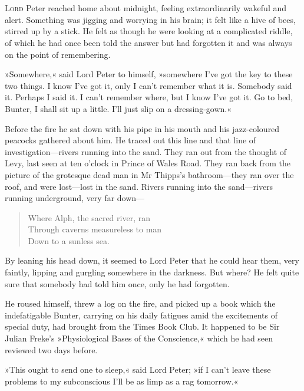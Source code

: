 \chapter[Chapter \thechapter]{}
\lettrine[lines=4]{L}{ord} Peter reached home about midnight, feeling extraordinarily wakeful and alert. Something was jigging and worrying in his brain; it felt like a hive of bees, stirred up by a stick. He felt as though he were looking at a complicated riddle, of which he had once been told the answer but had forgotten it and was always on the point of remembering.

»Somewhere,« said Lord Peter to himself, »somewhere I've got the key to these two things. I know I've got it, only I can't remember what it is. Somebody said it. Perhaps I said it. I can't remember where, but I know I've got it. Go to bed, Bunter, I shall sit up a little. I'll just slip on a dressing-gown.«

Before the fire he sat down with his pipe in his mouth and his jazz-coloured peacocks gathered about him. He traced out this line and that line of investigation—rivers running into the sand. They ran out from the thought of Levy, last seen at ten o'clock in Prince of Wales Road. They ran back from the picture of the grotesque dead man in Mr Thipps's bathroom—they ran over the roof, and were lost—lost in the sand. Rivers running into the sand—rivers running underground, very far down---

\begin{verse}
Where Alph, the sacred river, ran\\
Through caverns measureless to man\\
Down to a sunless sea.\\
\end{verse}


By leaning his head down, it seemed to Lord Peter that he could hear them, very faintly, lipping and gurgling somewhere in the darkness. But where? He felt quite sure that somebody had told him once, only he had forgotten.

He roused himself, threw a log on the fire, and picked up a book which the indefatigable Bunter, carrying on his daily fatigues amid the excitements of special duty, had brought from the Times Book Club. It happened to be Sir Julian Freke's »Physiological Bases of the Conscience,« which he had seen reviewed two days before.

»This ought to send one to sleep,« said Lord Peter; »if I can't leave these problems to my subconscious I'll be as limp as a rag tomorrow.«

